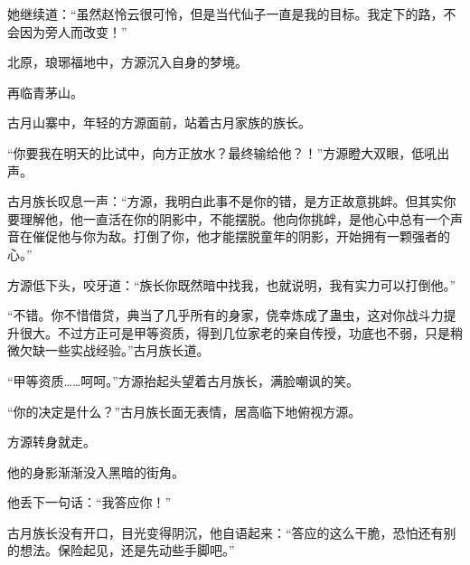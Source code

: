 \begin{this_body}
她继续道：“虽然赵怜云很可怜，但是当代仙子一直是我的目标。我定下的路，不会因为旁人而改变！”

北原，琅琊福地中，方源沉入自身的梦境。

再临青茅山。

古月山寨中，年轻的方源面前，站着古月家族的族长。

“你要我在明天的比试中，向方正放水？最终输给他？！”方源瞪大双眼，低吼出声。

古月族长叹息一声：“方源，我明白此事不是你的错，是方正故意挑衅。但其实你要理解他，他一直活在你的阴影中，不能摆脱。他向你挑衅，是他心中总有一个声音在催促他与你为敌。打倒了你，他才能摆脱童年的阴影，开始拥有一颗强者的心。”

方源低下头，咬牙道：“族长你既然暗中找我，也就说明，我有实力可以打倒他。”

“不错。你不惜借贷，典当了几乎所有的身家，侥幸炼成了蛊虫，这对你战斗力提升很大。不过方正可是甲等资质，得到几位家老的亲自传授，功底也不弱，只是稍微欠缺一些实战经验。”古月族长道。

“甲等资质……呵呵。”方源抬起头望着古月族长，满脸嘲讽的笑。

“你的决定是什么？”古月族长面无表情，居高临下地俯视方源。

方源转身就走。

他的身影渐渐没入黑暗的街角。

他丢下一句话：“我答应你！”

古月族长没有开口，目光变得阴沉，他自语起来：“答应的这么干脆，恐怕还有别的想法。保险起见，还是先动些手脚吧。”

\end{this_body}

